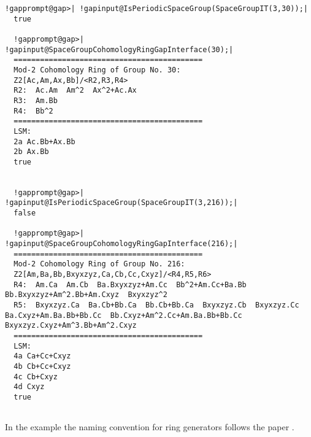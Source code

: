 \documentclass[a4paper,11pt]{report}
\begin{document}
{{{\begin{Verbatim}[commandchars=!@|,fontsize=\small,frame=single,label=Example]
  !gapprompt@gap>| !gapinput@IsPeriodicSpaceGroup(SpaceGroupIT(3,30));|
  true
  
  !gapprompt@gap>| !gapinput@SpaceGroupCohomologyRingGapInterface(30);|
  ===========================================
  Mod-2 Cohomology Ring of Group No. 30:
  Z2[Ac,Am,Ax,Bb]/<R2,R3,R4>
  R2:  Ac.Am  Am^2  Ax^2+Ac.Ax  
  R3:  Am.Bb  
  R4:  Bb^2  
  ===========================================
  LSM:
  2a Ac.Bb+Ax.Bb
  2b Ax.Bb
  true
  
  
  !gapprompt@gap>| !gapinput@IsPeriodicSpaceGroup(SpaceGroupIT(3,216));|
  false
  
  !gapprompt@gap>| !gapinput@SpaceGroupCohomologyRingGapInterface(216);|
  ===========================================
  Mod-2 Cohomology Ring of Group No. 216:
  Z2[Am,Ba,Bb,Bxyxzyz,Ca,Cb,Cc,Cxyz]/<R4,R5,R6>
  R4:  Am.Ca  Am.Cb  Ba.Bxyxzyz+Am.Cc  Bb^2+Am.Cc+Ba.Bb  Bb.Bxyxzyz+Am^2.Bb+Am.Cxyz  Bxyxzyz^2  
  R5:  Bxyxzyz.Ca  Ba.Cb+Bb.Ca  Bb.Cb+Bb.Ca  Bxyxzyz.Cb  Bxyxzyz.Cc  Ba.Cxyz+Am.Ba.Bb+Bb.Cc  Bb.Cxyz+Am^2.Cc+Am.Ba.Bb+Bb.Cc  Bxyxzyz.Cxyz+Am^3.Bb+Am^2.Cxyz 
  ===========================================
  LSM:
  4a Ca+Cc+Cxyz
  4b Cb+Cc+Cxyz
  4c Cb+Cxyz
  4d Cxyz
  true
  
\end{Verbatim}
 In the example the naming convention for ring generators follows the paper \cite{liuye}. }

 }

 }

 
\end{document}
